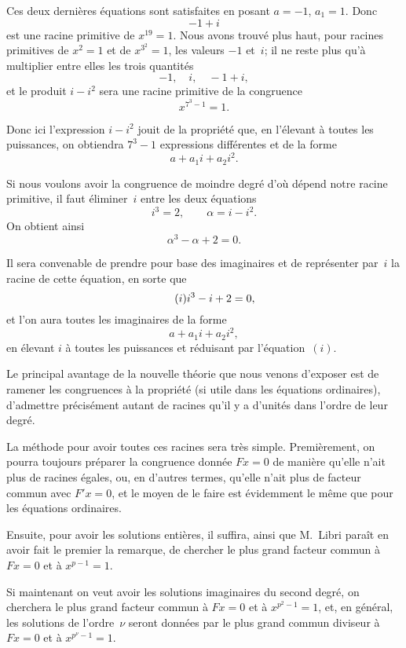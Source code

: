\documentclass[leqno,12pt]{book}[2005/09/16]
\newcommand{\Eq}[1]{\ensuremath{#1}}
\newcommand{\Tag}[1]{\tag*{\ensuremath{#1}}}
\begin{document}
Ces deux dernières équations sont satisfaites en posant $a = -1$,
$a_{1} = 1$. Donc
\[
-1 + i
\]
est une racine primitive de $x^{19} = 1$. Nous avons trouvé plus haut,
pour racines primitives de $x^{2} = 1$ et de $x^{3^{2}} = 1$, les valeurs $-1$
et~$i$; il ne reste plus qu'à multiplier entre elles les trois quantités
\[
-1,\quad i,\quad -1 + i,
\]
et le produit $i - i^{2}$ sera une racine primitive de la congruence
\[
x^{7^{3} - 1} = 1.
\]

Donc ici l'expression $i - i^{2}$ jouit de la propriété que, en l'élevant
à toutes les puissances, on obtiendra $7^{3} - 1$ expressions différentes
et de la forme
\[
a + a_{1} i + a_{2} i^{2}.
\]

Si nous voulons avoir la congruence de moindre degré d'où
dépend notre racine primitive, il faut éliminer~$i$ entre les deux
équations
\[
i^{3} = 2, \qquad
\alpha = i - i^{2}.
\]
On obtient ainsi
\[
\alpha^{3} - \alpha + 2 = 0.
\]

Il sera convenable de prendre pour base des imaginaires et de
représenter par~$i$ la racine de cette équation, en sorte que
\[
\Tag{(i)}
i^{3} - i + 2 = 0,
\]
et l'on aura toutes les imaginaires de la forme
\[
a + a_{1} i + a_{2} i^{2},
\]
en élevant $i$ à toutes les puissances et réduisant par l'équation~\Eq{(i)}.

Le principal avantage de la nouvelle théorie que nous venons
d'exposer est de ramener les congruences à la propriété (si utile
dans les équations ordinaires), d'admettre précisément autant de
racines qu'il y a d'unités dans l'ordre de leur degré.

La méthode pour avoir toutes ces racines sera très simple. Premièrement,
on pourra toujours préparer la congruence donnée
$Fx = 0$ de manière qu'elle n'ait plus de racines égales, ou,
en d'autres termes, qu'elle n'ait plus de facteur commun avec
$F'x = 0$, et le moyen de le faire est évidemment le même que
pour les équations ordinaires.

Ensuite, pour avoir les solutions entières, il suffira, ainsi que
M.~Libri paraît en avoir fait le premier la remarque, de chercher
le plus grand facteur commun à $Fx = 0$ et à $x^{p-1} = 1$.

Si maintenant on veut avoir les solutions imaginaires du second
degré, on cherchera le plus grand facteur commun à $Fx = 0$
et à $x^{p^{2}-1}\! = 1$, et, en général, les solutions de l'ordre~$\nu$ seront
données par le plus grand commun diviseur à $Fx = 0$ et à
$x^{p^{\nu}-1}\! = 1$.
\end{document}
